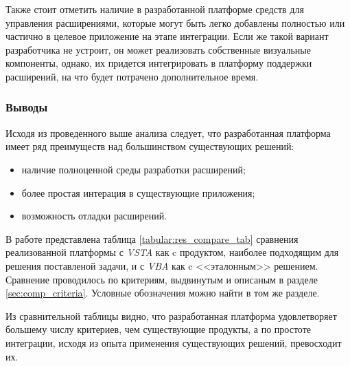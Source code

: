 Также стоит отметить наличие в разработанной платформе средств для управления расширениями, которые могут быть легко добавлены полностью или частично в целевое приложение на этапе интеграции. Если же такой вариант разработчика не устроит, он может реализовать собственные визуальные компоненты, однако, их придется интегрировать в платформу поддержки расширений, на что будет потрачено дополнительное время.

\subsubsection{Выводы}

Исходя из проведенного выше анализа следует, что разработанная платформа имеет ряд преимуществ над большинством существующих решений:

\begin{itemize}
   \item наличие полноценной среды разработки расширений;
   \item более простая интерация в существующие приложения;
   \item возможность отладки расширений.
\end{itemize}

В работе представлена таблица \ref{tabular:res_compare_tab} сравнения реализованной платформы с {\it VSTA} как c продуктом, наиболее подходящим для решения поставленой задачи, и с {\it VBA} как c <<эталонным>> решением. Сравнение проводилось по критериям, выдвинутым и описаным в разделе \ref{sec:comp_criteria}. Условные обозначения можно найти в том же разделе.



Из сравнительной таблицы видно, что разработанная платформа удовлетворяет большему числу критериев, чем существующие продукты, а по простоте интеграции, исходя из опыта применения существующих решений, превосходит их.

\pagebreak
